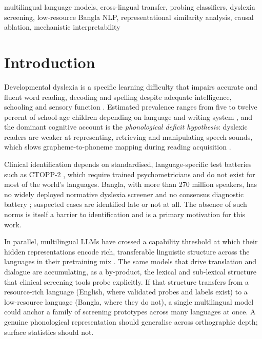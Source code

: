 \documentclass[conference]{IEEEtran}
\begin{document}
\begin{IEEEkeywords}
multilingual language models, cross-lingual transfer, probing classifiers, dyslexia screening, low-resource Bangla NLP, representational similarity analysis, causal ablation, mechanistic interpretability
\end{IEEEkeywords}

\section{Introduction}
Developmental dyslexia is a specific learning difficulty that impairs accurate and fluent word reading, decoding and spelling despite adequate intelligence, schooling and sensory function \cite{snowling2020dyslexia,peterson2012developmental}. Estimated prevalence ranges from five to twelve percent of school-age children depending on language and writing system \cite{ziegler2005reading,wagner2020prevalence}, and the dominant cognitive account is the \emph{phonological deficit hypothesis}: dyslexic readers are weaker at representing, retrieving and manipulating speech sounds, which slows grapheme-to-phoneme mapping during reading acquisition \cite{snowling2020dyslexia,goswami2011temporal}.

Clinical identification depends on standardised, language-specific test batteries such as CTOPP-2 \cite{wagner2013ctopp}, which require trained psychometricians and do not exist for most of the world's languages. Bangla, with more than 270 million speakers, has no widely deployed normative dyslexia screener and no consensus diagnostic battery \cite{nag2014dyslexia,nag2017indian,badsha2024mall}; suspected cases are identified late or not at all. The absence of such norms is itself a barrier to identification and is a primary motivation for this work.

In parallel, multilingual LLMs have crossed a capability threshold at which their hidden representations encode rich, transferable linguistic structure across the languages in their pretraining mix \cite{conneau2020xlmr,scao2022bloom,xue2021mt5}. The same models that drive translation and dialogue are accumulating, as a by-product, the lexical and sub-lexical structure that clinical screening tools probe explicitly. If that structure transfers from a resource-rich language (English, where validated probes and labels exist) to a low-resource language (Bangla, where they do not), a single multilingual model could anchor a family of screening prototypes across many languages at once. A genuine phonological representation should generalise across orthographic depth; surface statistics should not.
\end{document}

